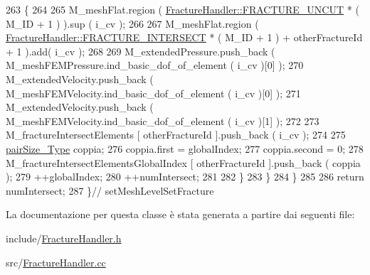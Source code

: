 \begin{DoxyCode}
263             \{  
264                 
265                 M\_meshFlat.region ( \hyperlink{classFractureHandler_a495ad4fc72d0c47c8f0424842f1153aaaa992cc3ad024a030ecd798dc319c95ac}{FractureHandler::FRACTURE\_UNCUT} * ( M\_ID
       + 1 ) ).sup ( i\_cv );
266                 
267                 M\_meshFlat.region ( \hyperlink{classFractureHandler_a495ad4fc72d0c47c8f0424842f1153aaa781cae3f3b99bf9357fed2833d315537}{FractureHandler::FRACTURE\_INTERSECT} 
      * ( M\_ID + 1 ) + otherFractureId + 1 ).add( i\_cv );
268 
269                 M\_extendedPressure.push\_back ( M\_meshFEMPressure.ind\_basic\_dof\_of\_element ( i\_cv )[0] );
270                 M\_extendedVelocity.push\_back ( M\_meshFEMVelocity.ind\_basic\_dof\_of\_element ( i\_cv )[0] );
271                 M\_extendedVelocity.push\_back ( M\_meshFEMVelocity.ind\_basic\_dof\_of\_element ( i\_cv )[1] );
272 
273                 M\_fractureIntersectElements [ otherFractureId ].push\_back ( i\_cv );
274 
275                 \hyperlink{Core_8h_a6453867d4e9bd858ad9577b4a1078511}{pairSize\_Type} coppia;
276                 coppia.first = globalIndex;
277                 coppia.second = 0;
278                 M\_fractureIntersectElementsGlobalIndex [ otherFractureId ].push\_back ( coppia );
279                 ++globalIndex;
280                 ++numIntersect;
281            
282                 \}
283         \}
284     \}
285 
286     \textcolor{keywordflow}{return} numIntersect;
287 \}\textcolor{comment}{// setMeshLevelSetFracture}
\end{DoxyCode}


La documentazione per questa classe è stata generata a partire dai seguenti file\-:\begin{DoxyCompactItemize}
\item 
include/\hyperlink{FractureHandler_8h}{Fracture\-Handler.\-h}\item 
src/\hyperlink{FractureHandler_8cc}{Fracture\-Handler.\-cc}\end{DoxyCompactItemize}
